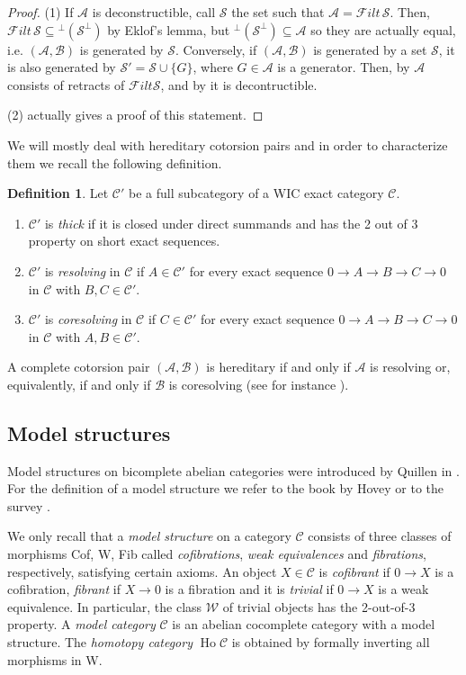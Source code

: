 \documentclass[11pt,a4paper,reqno]{amsart}
\renewcommand{\iff}{if and only if }
\newcommand{\A}{\mathcal{A}}
\newcommand{\B}{\mathcal{B}}
\newcommand{\C}{\mathcal{C}}
\newcommand{\F}{\mathcal{F}}
\newcommand{\clS}{\mathcal{S}}
\newcommand{\W}{\mathcal{W}}
\newcommand{\Ho}{\operatorname{Ho}}
\theoremstyle{plain}
\theoremstyle{definition}
\newtheorem{defn}[thm]{Definition}
\theoremstyle{remark}
\begin{document}
\begin{proof}
  (1) If $\A$ is deconstructible, call $\clS$ the set such that $\A = \F ilt\,\clS$. Then, $\F ilt\,\clS \subseteq {^\perp(\clS^\perp)}$ by Eklof's lemma, but ${^\perp(\clS^\perp)}\subseteq\A$ so they are actually equal, i.e. $(\A,\B)$ is generated by $\clS$.
  Conversely, if $(\A,\B)$ is generated by a set $\clS$, it is also generated by $\clS'=\clS\cup\{G\}$, where $G\in\A$ is a generator. Then, by \cite[Theorem~5.16]{Sto13} $\A$ consists of retracts of $\F ilt \clS$, and by \cite[Proposition~2.9(1)]{St10-deconstr} it is decontructible.

  (2) \cite[Theorem~5.16]{Sto13} actually gives a proof of this statement.
\end{proof}

%


We will mostly deal with  hereditary cotorsion pairs and
in order to characterize them we recall the following definition.
\begin{defn}\label{D:thick} Let $\C'$ be  a full subcategory of a WIC exact category $\C$.
\begin{enumerate}
\item $\C'$ is \emph{thick} if it is closed under direct summands and has the 2 out of 3 property on short exact sequences.
\item $\C'$ is \emph{resolving} in $\C$ if $A\in \C'$ for every exact sequence $0\to A\to B\to C\to 0$ in $\C$ with $B, C\in \C'$.
\item $\C'$ is \emph{coresolving} in $\C$ if $C\in \C'$ for every exact sequence $0\to A\to B\to C\to 0$ in $\C$ with $A, B\in \C'$.
\end{enumerate}
\end{defn}

A complete cotorsion pair $(\A, \B)$ is hereditary \iff $\A$ is resolving or, equivalently, \iff $\B$ is coresolving  (see for instance \cite[Lemma 6.17]{Sto13}).

%
%
%

\subsection{Model structures}\label{S:model}
Model structures on bicomplete abelian categories were introduced by Quillen in \cite{QHtp}.
For the definition of a model structure we refer to the book by Hovey \cite{Hov99} or to the survey \cite{Sto13}.

We only recall that a \emph{model structure} on a category $\C$ consists
of three classes of morphisms Cof, W, Fib called \emph{cofibrations}, \emph{weak equivalences} and \emph{fibrations}, respectively, satisfying certain axioms. An object $X\in \C$ is \emph{cofibrant} if $0\to X$ is a cofibration,  \emph{fibrant} if $X\to 0$ is a fibration and it is \emph{trivial} if $0\to X$ is a weak equivalence.
In particular, the class $\W$ of trivial objects has the 2-out-of-3 property.
A \emph{model category} $\C$ is an abelian cocomplete category with a model structure.
 The \emph{homotopy category} $\Ho \C$ is obtained by  formally inverting all morphisms in W.
\end{document}
